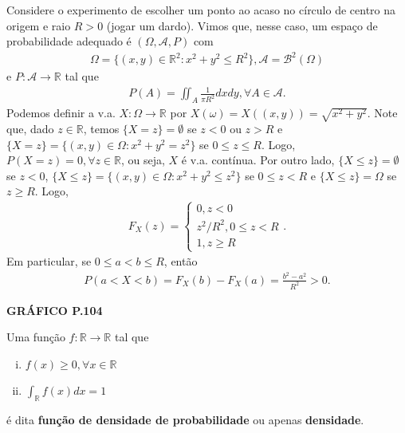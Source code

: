 \documentclass[../Notas.tex]{subfiles}
\begin{document}
\begin{example}
Considere o experimento de escolher um ponto ao acaso no círculo de centro na origem e raio $R>0$ (jogar um dardo). Vimos que, nesse caso, um espaço de probabilidade adequado é $(\Omega, \mathcal{A}, P)$ com
\begin{align*}
    \Omega = \{ (x,y)\in\mathbb{R}^2 : x^2+y^2\leq R^2 \}, \mathcal{A} = \mathcal{B}^2(\Omega)
\end{align*}
e $P:\mathcal{A}\to\mathbb{R}$ tal que
\begin{align*}
    P(A) = \iint_A \frac{1}{\pi R^2}dxdy, \forall A\in\mathcal{A}.
\end{align*}
Podemos definir a v.a. $X:\Omega\to\mathbb{R}$ por $X(\omega) = X((x,y)) = \sqrt{x^2+y^2}$. Note que, dado $z\in\mathbb{R}$, temos $\{X = z\} = \emptyset$ se $z < 0$ ou $z>R$ e $\{ X=z \} = \{ (x,y)\in\Omega : x^2+y^2 = z^2 \}$ se $0\leq z \leq R$. Logo, $P(X=z) = 0, \forall z\in\mathbb{R}$, ou seja, $X$ é v.a. contínua. Por outro lado, $\{X\leq z\} = \emptyset$ se $z<0$, $\{X\leq z\} = \{ (x,y)\in\Omega : x^2+y^2 \leq z^2 \}$ se $0\leq z < R$ e $\{X\leq z\} = \Omega$ se $z\geq R$. Logo,
\begin{align*}
    F_X(z) = \begin{cases}
    0, z < 0 \\
    z^2/R^2, 0\leq z < R \\
    1, z\geq R
    \end{cases}.
\end{align*}
Em particular, se $0\leq a < b\leq R$, então
\begin{align*}
    P(a < X < b) = F_X(b) - F_X(a) = \frac{b^2 - a^2}{R^2} > 0.
\end{align*}
\begin{center}
    \textbf{GRÁFICO P.104}
\end{center}
\end{example}

\begin{definition}
Uma função $f:\mathbb{R}\to\mathbb{R}$ tal que
\begin{enumerate}[(i)]
    \item $f(x)\geq 0, \forall x\in\mathbb{R}$ 
    \item $\displaystyle{ \int_{\mathbb{R}} f(x)dx  = 1}$
\end{enumerate}
é dita \textbf{função de densidade de probabilidade} ou apenas \textbf{densidade}.
\end{definition}
\end{document}
